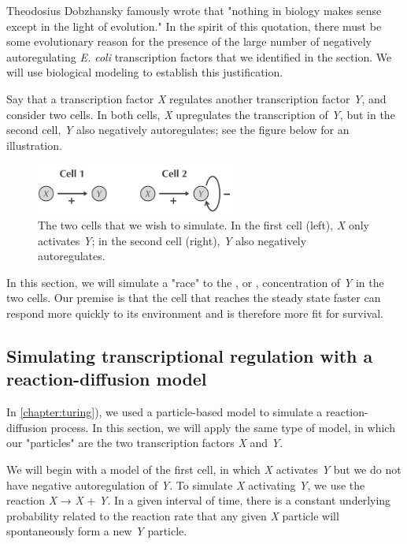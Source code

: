 Theodosius Dobzhansky famously wrote that "nothing in biology makes sense except in the light of evolution." In the spirit of this quotation, there must be some evolutionary reason for the presence of the large number of negatively autoregulating \textit{E. coli} transcription factors that we identified in the section. We will use biological modeling to establish this justification.

Say that a transcription factor \textit{X} regulates another transcription factor \textit{Y}, and consider two cells. In both cells, \textit{X} upregulates the transcription of \textit{Y}, but in the second cell, \textit{Y} also negatively autoregulates; see the figure below for an illustration.

\begin{figure}[h]
\centering
\mySfFamily
\includegraphics[width = 0.6\textwidth]{../assets/images/600px/two_cells.png}
\caption{The two cells that we wish to simulate. In the first cell (left), \textit{X} only activates \textit{Y}; in the second cell (right), \textit{Y} also negatively autoregulates.}
\label{fig:two_cells}
\end{figure}

In this section, we will simulate a "race" to the , or , concentration of \textit{Y} in the two cells. Our premise is that the cell that reaches the steady state faster can respond more quickly to its environment and is therefore more fit for survival.

\FloatBarrier
{}
\subsection{Simulating transcriptional regulation with a reaction-diffusion model}

In \autoref{chapter:turing}), we used a particle-based model to simulate a reaction-diffusion process. In this section, we will apply the same type of model, in which our "particles" are the two transcription factors \textit{X} and \textit{Y}.

We will begin with a model of the first cell, in which \textit{X} activates \textit{Y} but we do not have negative autoregulation of \textit{Y}. To simulate \textit{X} activating \textit{Y}, we use the reaction \textit{X} → \textit{X} + \textit{Y}. In a given interval of time, there is a constant underlying probability related to the reaction rate that any given \textit{X} particle will spontaneously form a new \textit{Y} particle.

